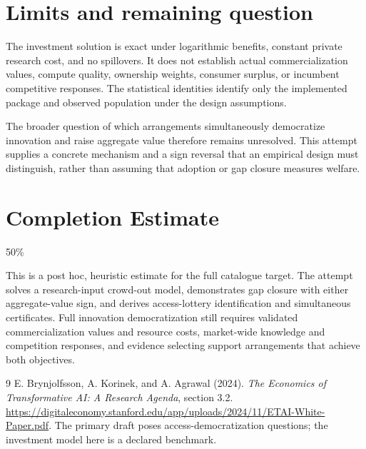 \documentclass[11pt,a4paper]{article}
\begin{document}
\section{Limits and remaining question}
The investment solution is exact under logarithmic benefits, constant private research cost, and no spillovers. It does not establish actual commercialization values, compute quality, ownership weights, consumer surplus, or incumbent competitive responses. The statistical identities identify only the implemented package and observed population under the design assumptions.

The broader question of which arrangements simultaneously democratize innovation and raise aggregate value therefore remains unresolved. This attempt supplies a concrete mechanism and a sign reversal that an empirical design must distinguish, rather than assuming that adoption or gap closure measures welfare.

\section{Completion Estimate}
50\%

This is a post hoc, heuristic estimate for the full catalogue target.
The attempt solves a research-input crowd-out model, demonstrates gap closure with either aggregate-value sign, and derives access-lottery identification and simultaneous certificates. Full innovation democratization still requires validated commercialization values and resource costs, market-wide knowledge and competition responses, and evidence selecting support arrangements that achieve both objectives.

\begin{thebibliography}{9}
 E. Brynjolfsson, A. Korinek, and A. Agrawal (2024).
\emph{The Economics of Transformative AI: A Research Agenda}, section 3.2.
\url{https://digitaleconomy.stanford.edu/app/uploads/2024/11/ETAI-White-Paper.pdf}.
The primary draft poses access-democratization questions; the investment model here is a declared benchmark.
\end{thebibliography}
\end{document}
